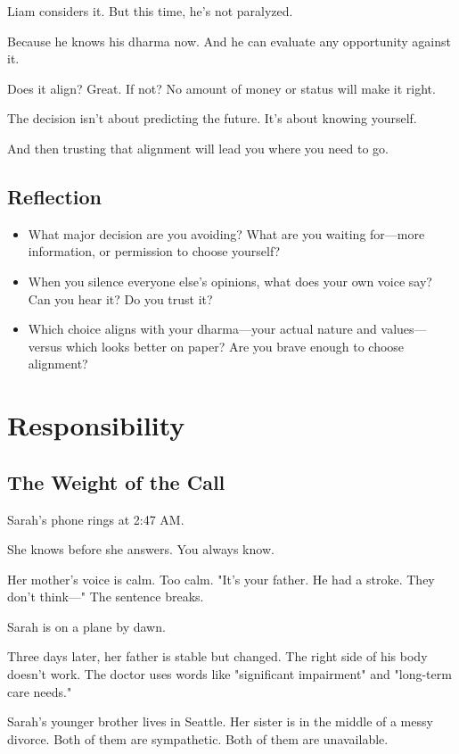 \documentclass[11pt,twoside]{book}
\begin{document}
Liam considers it. But this time, he's not paralyzed.

Because he knows his dharma now. And he can evaluate any opportunity against it.

Does it align? Great. If not? No amount of money or status will make it right.

The decision isn't about predicting the future. It's about knowing yourself.

And then trusting that alignment will lead you where you need to go.

\section*{Reflection}

\begin{itemize}
\item What major decision are you avoiding? What are you waiting for—more information, or permission to choose yourself?
\item When you silence everyone else's opinions, what does your own voice say? Can you hear it? Do you trust it?
\item Which choice aligns with your dharma—your actual nature and values—versus which looks better on paper? Are you brave enough to choose alignment?
\end{itemize}

\chapter{Responsibility}

\section*{The Weight of the Call}

Sarah's phone rings at 2:47 AM.

She knows before she answers. You always know.

Her mother's voice is calm. Too calm. "It's your father. He had a stroke. They don't think—" The sentence breaks.

Sarah is on a plane by dawn.

Three days later, her father is stable but changed. The right side of his body doesn't work. The doctor uses words like "significant impairment" and "long-term care needs."

Sarah's younger brother lives in Seattle. Her sister is in the middle of a messy divorce. Both of them are sympathetic. Both of them are unavailable.
\end{document}
